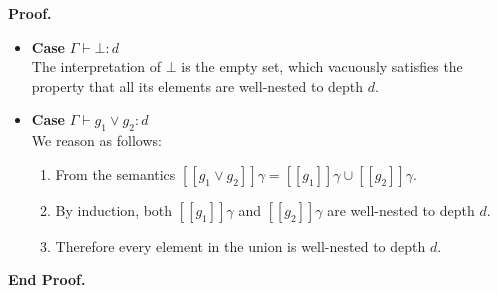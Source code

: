 \documentclass{article}
\newcommand{\lft}[1]{\left<{#1}\right.}
\newcommand{\rgt}[1]{\left.{#1}\right>}
\newcommand{\bnfalt}{\;\;|\;\;}
\newcommand{\judgebalance}[3][\Gamma]{{#1} \vdash {#2} : {#3}}
\newcommand{\interp}[1]{[\![{#1}]\!]}
\newenvironment{proof}{\noindent\textbf{Proof.}}{\noindent\textbf{End Proof.}}
\newenvironment{caseblock}{\begin{itemize}}{\end{itemize}}
\newenvironment{case}[1]{\item \textbf{Case} {#1}\\}{}
\begin{document}
\begin{proof}
\begin{caseblock}
  \begin{case}{$\judgebalance{\bot}{d}$}
    The interpretation of $\bot$ is the empty set, which vacuously satisfies the property that
    all its elements are well-nested to depth $d$. 
  \end{case}

  \begin{case}{$\judgebalance{g_1 \vee g_2}{d}$}
    We reason as follows:
    \begin{enumerate}
      \item From the semantics $\interp{g_1 \vee g_2}\gamma = \interp{g_1}\gamma \cup \interp{g_2}\gamma$.
      \item By induction, both $\interp{g_1}\gamma$ and $\interp{g_2}\gamma$ are well-nested to depth $d$.
      \item Therefore every element in the union is well-nested to depth $d$. 
    \end{enumerate}
    
  \end{case}
\end{caseblock}

\end{proof}


% 
% 
% 
\end{document}
